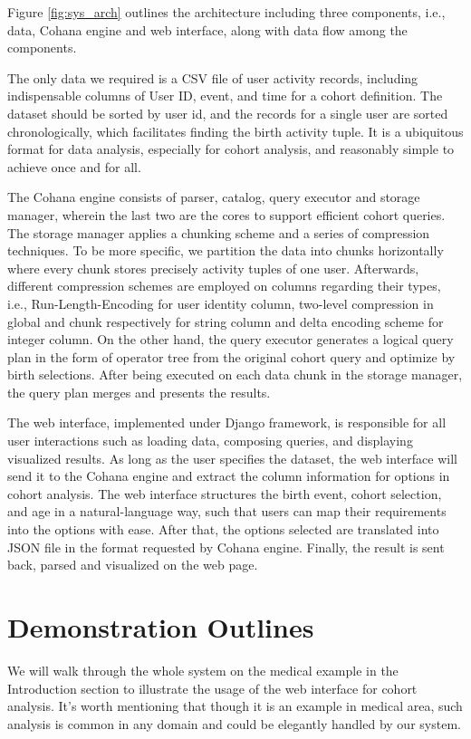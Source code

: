 \documentclass[10pt,conference,letterpaper]{IEEEtran}
\begin{document}
Figure \ref{fig:sys_arch} outlines the architecture including three components, i.e., data, Cohana engine and web interface, along with data flow among the components.

The only data we required is a CSV file of user activity records, including indispensable columns of User ID, event, and time for a cohort definition. The dataset should be sorted by user id, and the records for a single user are sorted chronologically, which facilitates finding the birth activity tuple. It is a ubiquitous format for data analysis, especially for cohort analysis, and reasonably simple to achieve once and for all.

The Cohana engine consists of parser, catalog, query executor and storage manager, wherein the last two are the cores to support efficient cohort queries. The storage manager applies a chunking scheme and a series of compression techniques. To be more specific, we partition the data into chunks horizontally where every chunk stores precisely activity tuples of one user. Afterwards, different compression schemes are employed on columns regarding their types, i.e., Run-Length-Encoding for user identity column, two-level compression in global and chunk respectively for string column and delta encoding scheme for integer column. On the other hand, the query executor generates a logical query plan in the form of operator tree from the original cohort query and optimize by birth selections. After being executed on each data chunk in the storage manager, the query plan merges and presents the results.

The web interface, implemented under Django framework, is responsible for all user interactions such as loading data, composing queries, and displaying visualized results. As long as the user specifies the dataset, the web interface will send it to the Cohana engine and extract the column information for options in cohort analysis. The web interface structures the birth event, cohort selection, and age in a natural-language way, such that users can map their requirements into the options with ease. After that, the options selected are translated into JSON file in the format requested by Cohana engine. Finally, the result is sent back, parsed and visualized on the web page.

\section{Demonstration Outlines}

We will walk through the whole system on the medical example in the Introduction section to illustrate the usage of the web interface for cohort analysis. It's worth mentioning that though it is an example in medical area, such analysis is common in any domain and could be elegantly handled by our system.
\end{document}
